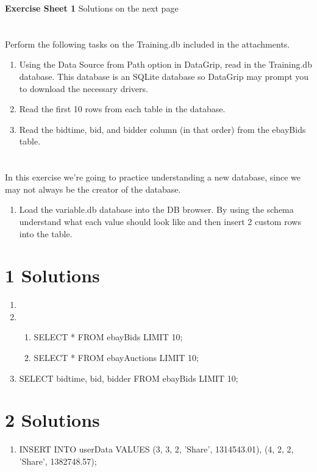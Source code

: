 \documentclass[USenglish,final,authoryear,12pt]{article}
\begin{document}
\textbf{\LARGE Exercise Sheet 1}\newline
Solutions on the next page
\section{}
Perform the following tasks on the Training.db included in the attachments.
\begin{enumerate}
	\item Using the Data Source from Path option in DataGrip, read in the Training.db database. This database is an SQLite database so DataGrip may prompt you to download the necessary drivers.
	\item Read the first 10 rows from each table in the database.
	\item Read the bidtime, bid, and bidder column (in that order) from the ebayBids table.
\end{enumerate}

\section{}
In this exercise we're going to practice understanding a new database, since we may not always be the creator of the database.
\begin{enumerate}
	\item Load the variable.db database into the DB browser. By using the schema understand what each value should look like and then insert 2 custom rows into the table.
\end{enumerate}
\pagebreak

\section{1 Solutions}
\begin{enumerate}
	\item
	\item \begin{enumerate}
		\item SELECT * \newline
		FROM ebayBids\newline
		LIMIT 10;
		\item SELECT * \newline
		FROM ebayAuctions\newline
		LIMIT 10;
	\end{enumerate}
	\item SELECT bidtime, bid, bidder \newline
	FROM ebayBids\newline
	LIMIT 10;
\end{enumerate}

\section{2 Solutions}
\begin{enumerate}
	\item INSERT INTO userData VALUES (3, 3, 2, 'Share', 1314543.01), (4, 2, 2, 'Share', 1382748.57);
\end{enumerate}
\end{document}
